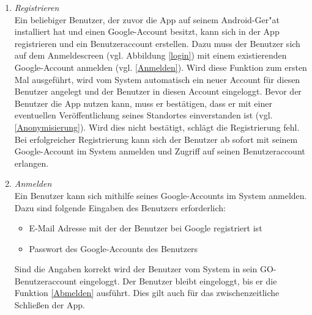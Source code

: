 \documentclass[parskip=full]{scrartcl}
\def\threedigits#1{%
  \ifnum#1<100 0\fi
  \ifnum#1<10 0\fi
  \number#1}
\begin{document}
\begin{enumerate}[label={\textbf{/F\protect\threedigits{\theenumi}0/}}, leftmargin=*]
	
	\item \textit{Registrieren}\label{Registrieren} \\ Ein beliebiger Benutzer, der zuvor die App auf seinem Android-Ger"at installiert hat und einen Google-Account besitzt, kann sich in der App registrieren und ein Benutzeraccount erstellen. Dazu muss der Benutzer sich auf dem Anmeldescreen (vgl. Abbildung \ref{login}) mit einem existierenden Google-Account anmelden (vgl. \ref{Anmelden}). Wird diese Funktion zum ersten Mal ausgeführt, wird vom System automatisch ein neuer Account für diesen Benutzer angelegt und der Benutzer in diesen Account eingeloggt. Bevor der Benutzer die App nutzen kann, muss er bestätigen, dass er mit einer eventuellen Veröffentlichung seines Standortes einverstanden ist (vgl. \ref{Anonymisierung}). Wird dies nicht bestätigt, schlägt die Registrierung fehl.
	Bei erfolgreicher Registrierung kann sich der Benutzer ab sofort mit seinem Google-Account im System anmelden und Zugriff auf seinen Benutzeraccount erlangen.

	 	
	\item \textit{Anmelden} \label{Anmelden} \\ Ein Benutzer kann sich mithilfe seines Google-Accounts im System anmelden. Dazu sind folgende Eingaben des Benutzers erforderlich:
	\begin{itemize}
		\item E-Mail Adresse mit der der Benutzer bei Google registriert ist
		\item Passwort des Google-Accounts des Benutzers
	\end{itemize}
	Sind die Angaben korrekt wird der Benutzer vom System in sein GO-Benutzeraccount eingeloggt. Der Benutzer bleibt eingeloggt, bis er die Funktion \ref{Abmelden} ausführt. Dies gilt auch für das zwischenzeitliche Schließen der App.
	
	

\end{enumerate}
\end{document}
